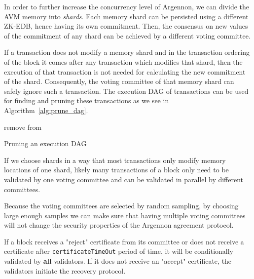 In order to further increase the concurrency level of Argennon, we can divide the AVM memory into \emph{shards}.
Each memory shard can be persisted using a different ZK-EDB, hence having its own commitment. Then, the
consensus on new values of the commitment of any shard can be achieved by a different voting committee.

If a transaction does not modify a memory shard and in the transaction ordering of the block it comes after
any transaction which modifies that shard, then the execution of that transaction is not needed for calculating
the new commitment of the shard. Consequently, the voting committee of that memory shard can safely ignore such a
transaction. The execution DAG of transactions can be used for finding and pruning these transactions as
we see in Algorithm~\ref{alg:prune_dag}.

\begin{algorithm}
    \DontPrintSemicolon
    \BlankLine
    {
        \RPrune{\V}\;
    }
    \BlankLine
    \Fn{\RPrune{\V}}
    {
        {
            remove \V from \Graph\;
            {
                \;
            }
        }
    }
    \caption{Pruning an execution DAG}\label{alg:prune_dag}
\end{algorithm}

If we choose shards in a way that most transactions only modify memory locations of one shard,
likely many transactions of a block only need to be validated by one voting committee and can be validated in
parallel by different committees.

Because the voting committees are selected by random sampling, by choosing large enough samples we can make sure
that having multiple voting committees will not change the security properties of the Argennon agreement protocol.


If a block receives a "reject" certificate from its committee or does not receive a certificate
after \texttt{certificateTimeOut} period of time, it will be conditionally validated by \textbf{all} validators. If
it does not receive an "accept" certificate, the validators initiate the recovery protocol.



